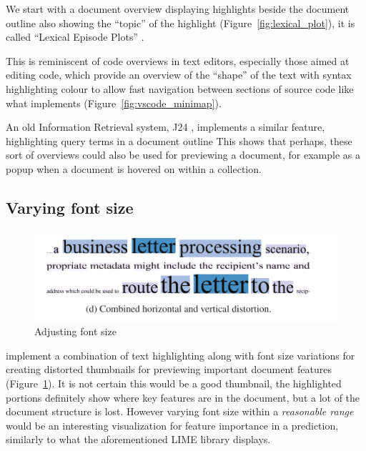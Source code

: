 \documentclass[\version]{l4proj}
\begin{document}
We start with a document overview displaying highlights beside the document outline also showing the ``topic'' of the highlight (Figure~\ref{fig:lexical_plot}), it is called ``Lexical Episode Plots'' \autocite{el-assadyVisArgueVisualText2016,goldExploratoryTextAnalysis2015}.

This is reminiscent of code overviews in text editors, especially those aimed at editing code, which provide an overview of the ``shape'' of the text with syntax highlighting colour to allow fast navigation between sections of source code like what \textcite{MicrosoftVscode2020} implements (Figure~\ref{fig:vscode_minimap}).

An old Information Retrieval system, J24 \autocite[7]{ogdenDocumentThumbnailVisualizations1998}, implements a similar feature, highlighting query terms in a document outline
This shows that perhaps, these sort of overviews could also be used for previewing a document, for example as a popup when a document is hovered on within a collection.

\subsection{Varying font size}

\begin{figure}
    \includegraphics[width=\linewidth]{images/document_visualization/font-size.png}
    \caption{Adjusting font size}\label{fig:font-size}
    \vspace{-5pt}
\end{figure}

\textcite{stoffelDocumentThumbnailsVariable2012} implement a combination of text highlighting along with font size variations for creating distorted thumbnails for previewing important document features (Figure~\ref{fig:font-size}).
It is not certain this would be a good thumbnail, the highlighted portions definitely show where key features are in the document, but a lot of the document structure is lost.
However varying font size within a \textit{reasonable range} would be an interesting visualization for feature importance in a prediction, similarly to what the aforementioned LIME library displays.
\end{document}
